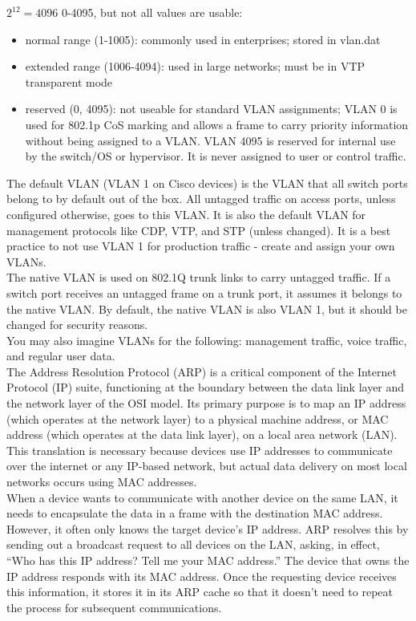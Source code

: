 \documentclass[parindent=0pt]{article}
\begin{document}
$2^12 = 4096$ 0-4095, but not all values are usable:
	\begin{itemize}
		\item normal range (1-1005): commonly used in enterprises; stored in vlan.dat
		\item extended range (1006-4094): used in large networks; must be in VTP transparent mode
		\item reserved (0, 4095): not useable for standard VLAN assignments; VLAN 0 is used for 802.1p CoS marking and allows a frame to carry priority information without being assigned to a VLAN. VLAN 4095 is reserved for internal use by the switch/OS or hypervisor. It is never assigned to user or control traffic.
	\end{itemize}

The default VLAN (VLAN 1 on Cisco devices) is the VLAN that all switch ports belong to by default out of the box. All untagged traffic on access ports, unless configured otherwise, goes to this VLAN. It is also the default VLAN for management protocols like CDP, VTP, and STP (unless changed). It is a best practice to not use VLAN 1 for production traffic - create and assign your own VLANs.\\

The native VLAN is used on 802.1Q trunk links to carry untagged traffic. If a switch port receives an untagged frame on a trunk port, it assumes it belongs to the native VLAN. By default, the native VLAN is also VLAN 1, but it should be changed for security reasons.\\

You may also imagine VLANs for the following: management traffic, voice traffic, and regular user data.\\

The Address Resolution Protocol (ARP) is a critical component of the Internet Protocol (IP) suite, functioning at the boundary between the data link layer and the network layer of the OSI model. Its primary purpose is to map an IP address (which operates at the network layer) to a physical machine address, or MAC address (which operates at the data link layer), on a local area network (LAN). This translation is necessary because devices use IP addresses to communicate over the internet or any IP-based network, but actual data delivery on most local networks occurs using MAC addresses.\\

When a device wants to communicate with another device on the same LAN, it needs to encapsulate the data in a frame with the destination MAC address. However, it often only knows the target device’s IP address. ARP resolves this by sending out a broadcast request to all devices on the LAN, asking, in effect, “Who has this IP address? Tell me your MAC address.” The device that owns the IP address responds with its MAC address. Once the requesting device receives this information, it stores it in its ARP cache so that it doesn't need to repeat the process for subsequent communications.\\
\end{document}
